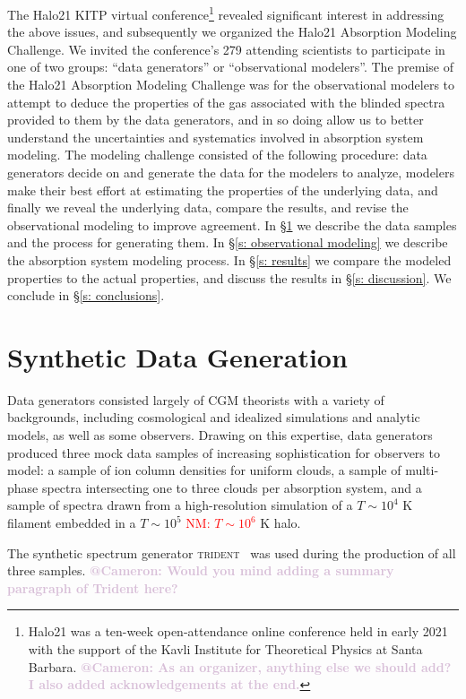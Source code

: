 \documentclass[fleqn,usenatbib]{mnras}
\makeatletter
\newcommand{\atcameron}[1]{\textcolor{Thistle}{\textbf{@Cameron: #1}}}
\newcommand{\nmr}[1]{\textcolor{red}{NM: #1}}
\makeatother
\begin{document}
The Halo21 KITP virtual conference\footnote{Halo21 was a ten-week open-attendance online conference held in early 2021 with the support of the Kavli Institute for Theoretical Physics at Santa Barbara. \atcameron{As an organizer, anything else we should add? I also added acknowledgements at the end.}} revealed significant interest in addressing the above issues, and subsequently we organized the Halo21 Absorption Modeling Challenge.
We invited the conference's 279 attending scientists to participate in one of two groups: ``data generators'' or ``observational modelers''.
The premise of the Halo21 Absorption Modeling Challenge was for the observational modelers to attempt to deduce the properties of the gas associated with the blinded spectra provided to them by the data generators, and in so doing allow us to better understand the uncertainties and systematics involved in absorption system modeling.
The modeling challenge consisted of the following procedure:
data generators decide on and generate the data for the modelers to analyze, modelers make their best effort at estimating the properties of the underlying data, and finally we reveal the underlying data, compare the results, and revise the observational modeling to improve agreement.
In \S\ref{s: data generation} we describe the data samples and the process for generating them.
In \S\ref{s: observational modeling} we describe the absorption system modeling process.
In \S\ref{s: results} we compare the modeled properties to the actual properties, and discuss the results in \S\ref{s: discussion}.
We conclude in \S\ref{s: conclusions}.

\section{Synthetic Data Generation}
\label{s: data generation}

Data generators consisted largely of CGM theorists with a variety of backgrounds, including cosmological and idealized simulations and analytic models, as well as some observers.
Drawing on this expertise, data generators produced three mock data samples of increasing sophistication for observers to model:
a sample of ion column densities for uniform clouds,
a sample of multi-phase spectra intersecting one to three clouds per absorption system,
and a sample of spectra drawn from a high-resolution simulation of a $T \sim 10^4$ K filament embedded in a \sout{$T \sim 10^5$} \nmr{$T \sim 10^6$} K halo.

The synthetic spectrum generator \textsc{trident}~\citep{Hummels2017} was used during the production of all three samples.
\atcameron{
Would you mind adding a summary paragraph of Trident here?
}
\end{document}
